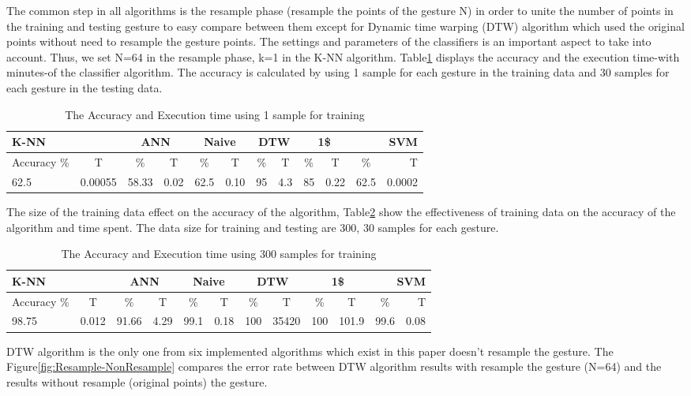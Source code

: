 \documentclass[twoside]{article}
\begin{document}
\begin{multicols}{2}
The common step in all algorithms is the resample phase (resample the points of the gesture N) in order to unite the number of points in the training and testing gesture to easy compare between them except for Dynamic time warping (DTW) algorithm which used the original points without need to resample the gesture points. The settings and parameters of the classifiers is an important aspect to take into account. Thus, we set N=64 in the resample phase, k=1 in the K-NN algorithm.
Table\ref{tab:Table1} displays the accuracy and the execution time-with minutes-of the classifier algorithm. The accuracy is calculated by using 1 sample for each gesture in the training data and 30 samples for each gesture in the testing data.
\begin{table}[t]
	\centering
		\begin{tabular}
			{||l|c|c|c|c|c|c|c|c|c|c|r|}\hline
		\multicolumn{2}{||l}{K-NN}& \multicolumn{2}{|c}{ANN} &\multicolumn{2}{|c}{Naive}&\multicolumn{2}{|c}{DTW}&\multicolumn{2}{|c}{1\$}& \multicolumn{2}{|r|}{SVM}\\ \hline
			\midrule
			Accuracy \%&T & \%&T & \%&T & \%&T & \%&T & \%&T \\ \hline
			62.5&0.00055	& 58.33&0.02 & 62.5&0.10 & 95&4.3 & 85&0.22 & 62.5&0.0002 \\ \hline
		\end{tabular}
	\caption{The Accuracy and Execution time using 1 sample for training}
	\label{tab:Table1}
\end{table}
The size of the training data effect on the accuracy of the algorithm, Table\ref{tab:Table2} show the effectiveness of training data on the accuracy of the algorithm and time spent.
The data size for training and testing are 300, 30 samples for each gesture.
\begin{table}[t]
	\centering
		\begin{tabular}
			{||l|c|c|c|c|c|c|c|c|c|c|r|}\hline
						\multicolumn{2}{||l}{K-NN}& \multicolumn{2}{|c}{ANN} &\multicolumn{2}{|c}{Naive}&\multicolumn{2}{|c}{DTW}&\multicolumn{2}{|c}{1\$}& \multicolumn{2}{|r|}{SVM}\\ \hline
			\midrule
			Accuracy \%&T & \%&T & \%&T & \%&T & \%&T & \%&T \\ \hline
			98.75&0.012	& 91.66&4.29 & 99.1&0.18 & 100&35420 & 100&101.9 & 99.6&0.08 \\ \hline
		\end{tabular}
	\caption{The Accuracy and Execution time using 300 samples for training}
	\label{tab:Table2}
\end{table}
DTW algorithm is the only one from six implemented algorithms which exist in this paper doesn't resample the gesture. The Figure\ref{fig:Resample-NonResample} compares the error rate between DTW algorithm results with resample the gesture (N=64) and the results without resample (original points) the gesture.


\end{multicols}
\end{document}
